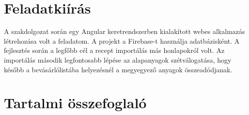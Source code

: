 \documentclass[12pt]{report}
\theoremstyle{definition}
\begin{document}
\chapter*{Feladatkiírás}

A szakdolgozat során egy Angular keretrendszerben kialakított webes alkalmazás létrehozása volt a feladatom.
A projekt a Firebase-t használja adatbázisként. A fejlesztés során a legfőbb cél a recept importálás más honlapokról volt.
Az importálás második legfontosabb lépése az alapanyagok szétválogatása,
hogy később a bevásárlólistába helyezésnél a megyegyező anyagok összeadódjanak.

\chapter*{Tartalmi összefoglaló}
\end{document}
